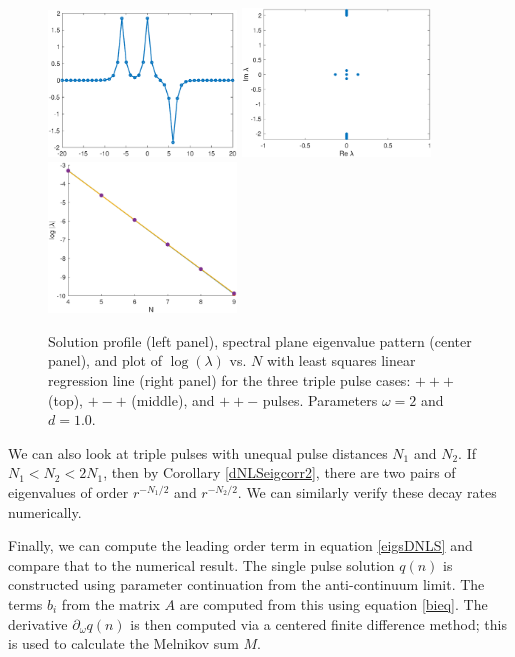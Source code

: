 \documentclass[12pt]{article}
\begin{document}
\begin{figure}[H]
\includegraphics[width=5cm]{dnlsPPM.eps}
\includegraphics[width=5cm]{dnlsPPMeig.eps}
\includegraphics[width=5cm]{dnlsPPMdecay.eps}
\caption{Solution profile (left panel), spectral plane eigenvalue pattern (center panel), and plot of $\log(\lambda)$ vs. $N$ with least squares linear regression line (right panel) for the three triple pulse cases: $+++$ (top), $+-+$ (middle), and $++-$ pulses. Parameters $\omega = 2$ and $d = 1.0$.}
\label{fig:eigendecay2}
\end{figure}

We can also look at triple pulses with unequal pulse distances $N_1$ and $N_2$. If $N_1 < N_2 < 2 N_1$, then by Corollary \ref{dNLSeigcorr2}, there are two pairs of eigenvalues of order $r^{-N_1/2}$ and $r^{-N_2/2}$. We can similarly verify these decay rates numerically.

Finally, we can compute the leading order term in equation \eqref{eigsDNLS} and compare that to the numerical result. The single pulse solution $q(n)$ is constructed using parameter continuation from the anti-continuum limit. The terms $b_i$ from the matrix $A$ are computed from this using equation \eqref{bieq}. The derivative $\partial_\omega q(n)$ is then computed via a centered finite difference method; this is used to calculate the Melnikov sum $M$. 
\end{document}
